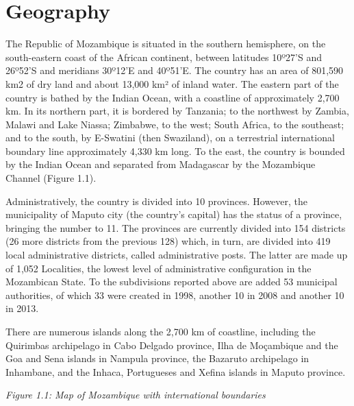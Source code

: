 \documentclass[
]{book}
\begin{document}
\hypertarget{geography}{%
\section{Geography}\label{geography}}

The Republic of Mozambique is situated in the southern hemisphere, on the south-eastern coast of the African continent, between latitudes 10º27'S and 26º52'S and meridians 30º12'E and 40º51'E. The country has an area of 801,590 km2 of dry land and about 13,000 km² of inland water. The eastern part of the country is bathed by the Indian Ocean, with a coastline of approximately 2,700 km. In its northern part, it is bordered by Tanzania; to the northwest by Zambia, Malawi and Lake Niassa; Zimbabwe, to the west; South Africa, to the southeast; and to the south, by E-Swatini (then Swaziland), on a terrestrial international boundary line approximately 4,330 km long. To the east, the country is bounded by the Indian Ocean and separated from Madagascar by the Mozambique Channel (Figure 1.1).

Administratively, the country is divided into 10 provinces. However, the municipality of Maputo city (the country's capital) has the status of a province, bringing the number to 11. The provinces are currently divided into 154 districts (26 more districts from the previous 128) which, in turn, are divided into 419 local administrative districts, called administrative posts. The latter are made up of 1,052 Localities, the lowest level of administrative configuration in the Mozambican State. To the subdivisions reported above are added 53 municipal authorities, of which 33 were created in 1998, another 10 in 2008 and another 10 in 2013.

There are numerous islands along the 2,700 km of coastline, including the Quirimbas archipelago in Cabo Delgado province, Ilha de Moçambique and the Goa and Sena islands in Nampula province, the Bazaruto archipelago in Inhambane, and the Inhaca, Portugueses and Xefina islands in Maputo province.

\emph{Figure 1.1: Map of Mozambique with international boundaries}
\end{document}
